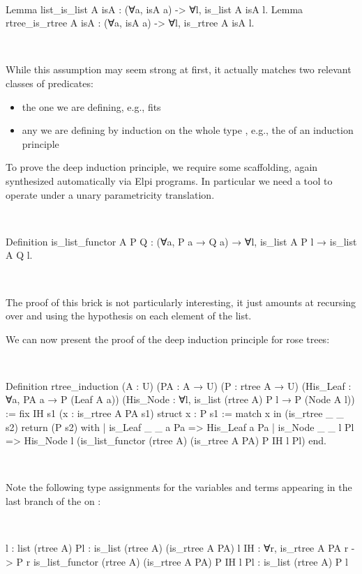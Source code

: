 \documentclass[a4paper, 11pt]{book}
\newenvironment{rocqcode}
  {\VerbatimEnvironment~\\\begin{rocqbox}\begin{xrocqcode}}{\end{xrocqcode}
\end{rocqbox}\\}
\begin{document}
\begin{rocqcode}
Lemma list_is_list A isA : (∀a, isA a) -> ∀l, is_list A isA l.
Lemma rtree_is_rtree A isA : (∀a, isA a) -> ∀l, is_rtree A isA l.
\end{rocqcode}

While this assumption may seem strong at first, it actually matches two
relevant classes of predicates:
\begin{itemize}
  \item the one we are defining, e.g.,  fits
  \item any  we are defining by induction on the whole type
    , e.g., the  of an induction principle
\end{itemize}

To prove the deep induction principle, we require some scaffolding, again
synthesized automatically via Elpi programs. In particular we need
a tool to operate under a unary parametricity translation.

\begin{rocqcode}
Definition is_list_functor A P Q :
  (∀a, P a → Q a) → ∀l, is_list A P l → is_list A Q l.
\end{rocqcode}

\noindent
The proof of this brick is not particularly interesting, it just
amounts at recursing over  and using the hypothesis
on each element of the list.

We can
now present the proof of the deep induction principle for rose trees:

\begin{rocqcode}
Definition rtree_induction (A : U) (PA : A → U) (P : rtree A → U)
    (His_Leaf : ∀a, PA a → P (Leaf A a))
    (His_Node : ∀l, is_list (rtree A) P l → P (Node A l))
:=
  fix IH s1 (x : is_rtree A PA s1) {struct x} : P s1 :=
  match x in (is_rtree _ _ s2) return (P s2) with
  | is_Leaf _ _ a Pa =>
      His_Leaf a Pa
  | is_Node _ _ l Pl =>
      His_Node l (is_list_functor (rtree A) (is_rtree A PA) P IH l Pl)
  end.
\end{rocqcode}

Note the following type assignments for the variables and terms appearing in
the last branch of the  on :

\begin{rocqcode}
l  : list (rtree A)
Pl : is_list (rtree A) (is_rtree A PA) l
IH : ∀r, is_rtree A PA r -> P r
is_list_functor (rtree A) (is_rtree A PA) P IH l Pl :
  is_list (rtree A) P l
\end{rocqcode}
\end{document}

